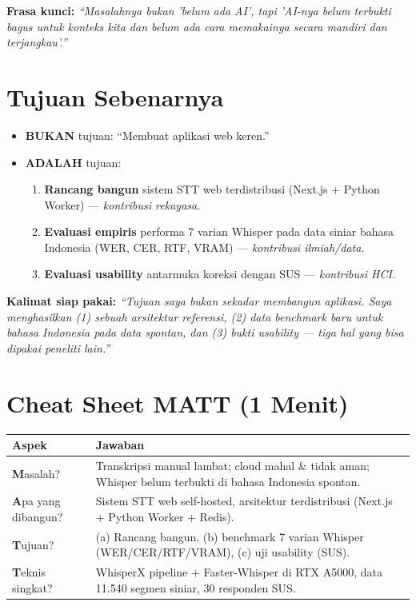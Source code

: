 \documentclass[11pt,a4paper]{article}
\begin{document}
\textbf{Frasa kunci:} \emph{``Masalahnya bukan 'belum ada AI', tapi 'AI-nya belum terbukti bagus untuk konteks kita dan belum ada cara memakainya secara mandiri dan terjangkau'.''}

\section{Tujuan Sebenarnya}

\begin{itemize}
  \item \textbf{BUKAN} tujuan: ``Membuat aplikasi web keren.''
  \item \textbf{ADALAH} tujuan:
  \begin{enumerate}
    \item \textbf{Rancang bangun} sistem STT web terdistribusi (Next.js + Python Worker) --- \emph{kontribusi rekayasa}.
    \item \textbf{Evaluasi empiris} performa 7 varian Whisper pada data siniar bahasa Indonesia (WER, CER, RTF, VRAM) --- \emph{kontribusi ilmiah/data}.
    \item \textbf{Evaluasi usability} antarmuka koreksi dengan SUS --- \emph{kontribusi HCI}.
  \end{enumerate}
\end{itemize}

\textbf{Kalimat siap pakai:} \emph{``Tujuan saya bukan sekadar membangun aplikasi. Saya menghasilkan (1) sebuah arsitektur referensi, (2) data benchmark baru untuk bahasa Indonesia pada data spontan, dan (3) bukti usability --- tiga hal yang bisa dipakai peneliti lain.''}

\section{Cheat Sheet MATT (1 Menit)}

\begin{center}
\renewcommand{\arraystretch}{1.3}
\begin{tabular}{|p{2.5cm}|p{10.5cm}|}
\hline
\rowcolor{lightgray} \textbf{Aspek} & \textbf{Jawaban} \\
\hline
\textbf{M}asalah? & Transkripsi manual lambat; cloud mahal \& tidak aman; Whisper belum terbukti di bahasa Indonesia spontan. \\
\hline
\textbf{A}pa yang dibangun? & Sistem STT web self-hosted, arsitektur terdistribusi (Next.js + Python Worker + Redis). \\
\hline
\textbf{T}ujuan? & (a) Rancang bangun, (b) benchmark 7 varian Whisper (WER/CER/RTF/VRAM), (c) uji usability (SUS). \\
\hline
\textbf{T}eknis singkat? & WhisperX pipeline + Faster-Whisper di RTX A5000, data 11.540 segmen siniar, 30 responden SUS. \\
\hline
\end{tabular}
\end{center}
\end{document}
